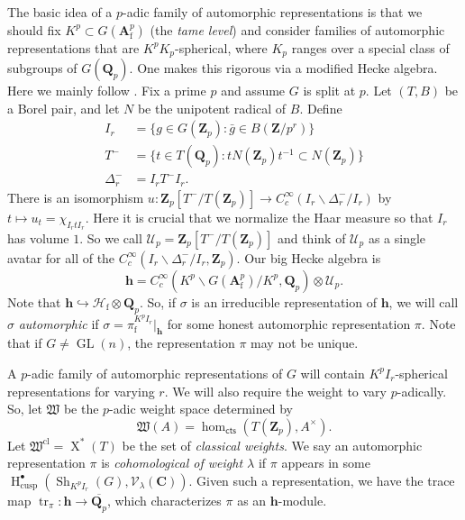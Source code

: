 \documentclass[oneside]{amsart}
\DeclareMathOperator{\character}{X}
\DeclareMathOperator{\GL}{GL}
\DeclareMathOperator{\h}{H}
\DeclareMathOperator{\shimura}{Sh}
\DeclareMathOperator{\trace}{tr}
\newcommand{\cU}{\mathcal{U}}
\newcommand{\dA}{\mathbf{A}}
\newcommand{\dC}{\mathbf{C}}
\newcommand{\dQ}{\mathbf{Q}}
\newcommand{\dZ}{\mathbf{Z}}
\newcommand{\fW}{\mathfrak{W}}
\newcommand{\sV}{\mathscr{V}}
\newcommand{\classical}{\mathrm{cl}}
\newcommand{\cusp}{\mathrm{cusp}}
\newcommand{\finite}{\mathrm{f}}
\newcommand{\hecke}{\mathcal{H}}
\newcommand{\hida}{\mathbf{h}}
\begin{document}
The basic idea of a $p$-adic family of automorphic representations is that 
we should fix $K^p\subset G(\dA^p_\finite)$ (the \emph{tame level}) and consider 
families of automorphic representations that are $K^p K_p$-spherical, where $K_p$ 
ranges over a special class of subgroups of $G(\dQ_p)$. One makes this rigorous 
via a modified Hecke algebra. Here we mainly follow \cite[4.1]{urban-2011}. 
Fix a prime $p$ and assume $G$ is split at $p$. Let $(T,B)$ be a Borel pair, 
and let $N$ be the unipotent radical of $B$. Define 
\begin{align*}
  I_r &= \{g\in G(\dZ_p):\bar g\in B(\dZ/p^r)\} \\
  T^- &= \{t\in T(\dQ_p):t N(\dZ_p) t^{-1} \subset N(\dZ_p)\} \\
  \Delta_r^- &= I_r T^- I_r .
\end{align*}
There is an isomorphism 
$u:\dZ_p[T^-/T(\dZ_p)]\to C_c^\infty(I_r \backslash \Delta_r^- / I_r)$ by 
$t\mapsto u_t=\chi_{I_r t I_r}$. Here it is crucial that we normalize the 
Haar measure so that $I_r$ has volume $1$. So we call 
$\cU_p=\dZ_p[T^-/T(\dZ_p)]$ and think of $\cU_p$ as a single avatar for all 
of the $C_c^\infty(I_r \backslash \Delta_r^- / I_r,\dZ_p)$. Our big Hecke 
algebra is 
\[
  \hida = C_c^\infty(K^p\backslash G(\dA_\finite^p)/K^p,\dQ_p)\otimes \cU_p .
\]
Note that $\hida\hookrightarrow \hecke_\finite\otimes \dQ_p$. So, if 
$\sigma$ is an irreducible representation of $\hida$, we will call $\sigma$ 
\emph{automorphic} if $\sigma=\pi_\finite^{K^p I_r}|_\hida$ for some honest 
automorphic representation $\pi$. Note that if $G\ne \GL(n)$, the 
representation $\pi$ may not be unique. 

A $p$-adic family of automorphic representations of $G$ will contain 
$K^p I_r$-spherical representations for varying $r$. We will also require the 
weight to vary $p$-adically. So, let $\fW$ be the $p$-adic weight space 
determined by 
\[
  \fW(A) = \hom_\mathsf{cts}(T(\dZ_p),A^\times) .
\]
Let $\fW^\classical=\character^\ast(T)$ be the set of \emph{classical 
weights}. We say an automorphic representation $\pi$ is \emph{cohomological of 
weight $\lambda$} if $\pi$ appears in some 
$\h_\cusp^\bullet(\shimura_{K^p I_r}(G),\sV_\lambda(\dC))$. Given such a 
representation, we have the trace map $\trace_\pi:\hida\to \overline{\dQ_p}$, 
which characterizes $\pi$ as an $\hida$-module. 
\end{document}
